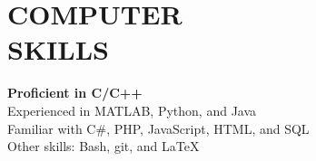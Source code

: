 \documentclass[margin, 10pt]{res}
\begin{document}
\begin{resume}
\begin{itemize}
\end{itemize}

\section{COMPUTER \\ SKILLS}
\textbf{Proficient in C/C++}\\
Experienced in MATLAB, Python, and Java\\
Familiar with C\#, PHP, JavaScript, HTML, and SQL\\ 
Other skills: Bash, git, and \LaTeX


\end{resume}
\end{document}
